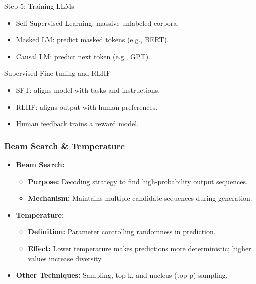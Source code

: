 \documentclass{beamer}       %
\begin{document}

\begin{frame}{Step 5: Training LLMs}
  \begin{itemize}
    \item Self-Supervised Learning: massive unlabeled corpora.
    \item Masked LM: predict masked tokens (e.g., BERT).
    \item Causal LM: predict next token (e.g., GPT).
  \end{itemize}
\end{frame}

\begin{frame}{Supervised Fine-tuning and RLHF}
  \begin{itemize}
    \item SFT: aligns model with tasks and instructions.
    \item RLHF: aligns output with human preferences.
    \item Human feedback trains a reward model.
  \end{itemize}
\end{frame}

\begin{frame}
\frametitle{Beam Search \& Temperature}
\begin{itemize}
    \item \textbf{Beam Search:}
    \begin{itemize}
        \item \textbf{Purpose:} Decoding strategy to find high-probability output sequences.
        \item \textbf{Mechanism:} Maintains multiple candidate sequences during generation.
    \end{itemize}
    \item \textbf{Temperature:}
    \begin{itemize}
        \item \textbf{Definition:} Parameter controlling randomness in prediction.
        \item \textbf{Effect:} Lower temperature makes predictions more deterministic; higher values increase diversity.
    \end{itemize}
    \item \textbf{Other Techniques:} Sampling, top-k, and nucleus (top-p) sampling.
\end{itemize}
\end{frame}
\end{document}
